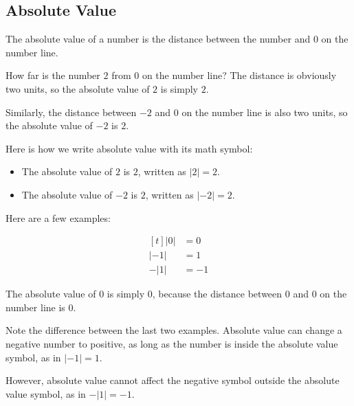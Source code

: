 \subsection{Absolute Value}
The absolute value of a number is the distance between the number and $0$ on the number line.

How far is the number $2$ from $0$ on the number line? The distance is obviously two units, so the absolute value of $2$ is simply $2$.

Similarly, the distance between $-2$ and $0$ on the number line is also two units, so the absolute value of $-2$ is $2$.

\begin{figure}[!htb]
\centering
	\label{fig:AbsoluteValue}
\end{figure}

Here is how we write absolute value with its math symbol:
\begin{itemize}
\item The absolute value of $2$ is $2$, written as $\lvert 2 \rvert =2$.
\item The absolute value of $-2$ is $2$, written as $\lvert -2 \rvert=2$.
\end{itemize}

Here are a few examples:

\[
\begin{aligned}[t]
	\lvert 0 \rvert &=0 \\
	\lvert -1 \rvert &=1 \\
	-\lvert 1 \rvert &=-1
\end{aligned}
\]

The absolute value of $0$ is simply $0$, because the distance between $0$ and $0$ on the number line is $0$.

Note the difference between the last two examples. Absolute value can change a negative number to positive, as long as the number is inside the absolute value symbol, as in $\lvert -1 \rvert =1$.

However, absolute value cannot affect the negative symbol outside the absolute value symbol, as in $-\lvert 1 \rvert =-1$.

